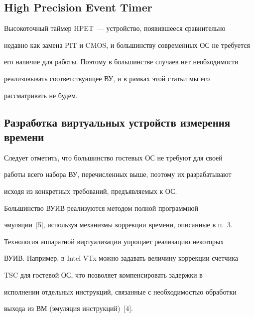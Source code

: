 \subsection{High Precision Event Timer}





     Высокоточный таймер HPET~--- устройство, появившееся сравнительно 


недавно как замена PIT и CMOS, и большинству современных ОС не требуется 


его наличие для работы. Поэтому в большинстве случаев нет необходимости 


реализовывать соответствующее ВУ, и в рамках этой статьи мы его 


рассматривать не будем.





\subsection{Разработка виртуальных устройств измерения времени}





     Следует отметить, что большинство гостевых ОС не требуют для своей 


работы всего набора ВУ, перечисленных выше, поэтому их разрабатывают 


исходя из конкретных требований, предъявляемых к ОС.


     


     Большинство ВУИВ реализуются методом полной программной 


эмуляции~[5], используя механизмы коррекции времени, описанные в п.~3.


     


     Технология аппаратной виртуализации упрощает реализацию некоторых 


\mbox{ВУИВ}. Например, в Intel VTx можно задавать величину коррекции счетчика 


TSC для гостевой ОС, что позволяет компенсировать задержки в 


исполнении отдельных инструкций, связанные с необходимостью обработки 


выхода из ВМ (эмуляция инструкций)~[4].





